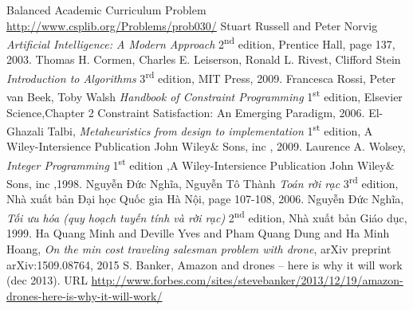\documentclass[a4paper,12pt]{report}
\begin{document}
\begin{thebibliography}{9}
 Balanced Academic Curriculum Problem  \url{http://www.csplib.org/Problems/prob030/}
 Stuart Russell and Peter Norvig 
\textit{Artificial Intelligence: A Modern Approach} 2\textsuperscript{nd } edition, Prentice Hall, page 137,  2003.
 Thomas H. Cormen, Charles E. Leiserson, Ronald L. Rivest, Clifford Stein 
\textit{Introduction to Algorithms} 3\textsuperscript{rd } edition, MIT Press,  2009.
 Francesca Rossi, Peter van Beek, Toby Walsh 
\textit{Handbook of Constraint Programming} 1\textsuperscript{st} edition, Elsevier Science,Chapter 2 Constraint Satisfaction:
An Emerging Paradigm,  2006.
 El-Ghazali Talbi,
\textit{Metaheuristics
from design to implementation} 1\textsuperscript{st} edition, A Wiley-Intersience Publication John Wiley$\&$ Sons, inc ,  2009.
Laurence A. Wolsey,
\textit{Integer Programming} 1\textsuperscript{st} edition
,A Wiley-Intersience Publication John Wiley$\&$ Sons, inc 
,1998.
 Nguyễn Đức Nghĩa, Nguyễn Tô Thành 
\textit{Toán rời rạc} 3\textsuperscript{rd} edition, Nhà xuất bản Đại học Quốc gia Hà Nội, page 107-108,  2006.
 Nguyễn Đức Nghĩa,  
\textit{Tối ưu hóa (quy hoạch tuyến tính và rời rạc)} 2\textsuperscript{nd} edition, Nhà xuất bản Giáo dục,  1999.
 Ha Quang Minh and Deville Yves and Pham Quang Dung and Ha Minh Hoang, \textit{On the min cost traveling salesman problem with drone}, arXiv preprint arXiv:1509.08764, 2015
 S. Banker, Amazon and drones – here is why it will work (dec 2013).
URL \url{http://www.forbes.com/sites/stevebanker/2013/12/19/amazon-drones-here-is-why-it-will-work/}


\end{thebibliography}
\end{document}
